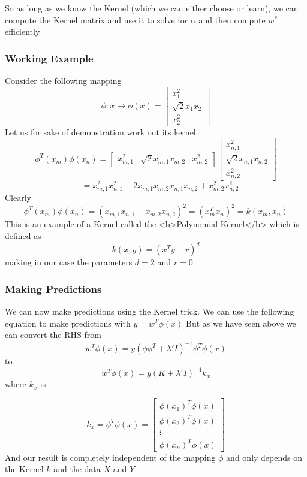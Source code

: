 \documentclass[hidelinks]{book}
\numberwithin{equation}{section}
\begin{document}
  So as long as we know the Kernel (which we can either choose or learn), we
  can compute the Kernel matrix and use it to solve for $\alpha$ and then
  compute $w^*$ efficiently

  \subsubsection{Working Example}
  Consider the following mapping $$ \phi: x \rightarrow \phi(x) = \begin{bmatrix}
  x_1^2 \\ \sqrt{2} x_1 x_2 \\ x_2^2 \end{bmatrix} $$
  Let us for sake of demonstration work out its kernel
  $$ \phi^T(x_m) \phi(x_n) = \begin{bmatrix} x_{m,1}^2 & \sqrt{2} x_{m,1}
  x_{m,2} & x_{m,2}^2 \end{bmatrix} \begin{bmatrix} x_{n,1}^2
  \\ \sqrt{2} x_{n,1} x_{n,2} \\ x_{n,2}^2 \end{bmatrix}
  $$
  $$ \quad = x_{m,1}^2 x_{n,1}^2 + 2 x_{m,1} x_{m,2} x_{n,1} x_{n,2}
  + x_{m,2}^2 x_{n,2}^2 $$
  Clearly $$ \phi^T(x_m) \phi(x_n) = (x_{m,1}
  x_{n,1} + x_{m,2} x_{n,2})^2 = (x_m^T x_n)^2 = k(x_m, x_n) $$
  This is an example of a Kernel called the <b>Polynomial Kernel</b> which is
  defined as $$ k(x, y) = (x^T y + r)^d $$ making in our case the parameters
  $d = 2$ and $r = 0$

  \subsubsection{Making Predictions}
  We can now make predictions using the Kernel trick. We can use the following
  equation to make predictions with $ y = w^T \phi(x) $ But as we have seen
  above we can convert the RHS from
  $$ w^T \phi(x) = y(\phi \phi^T + \lambda' I)^{-1} \phi^T \phi(x) $$
  to  $$ w^T \phi(x) = y(K + \lambda' I)^{-1} k_x $$ where $k_x$ is

  $$ k_x = \phi^T \phi(x) = \begin{bmatrix} \phi(x_1)^T \phi(x) \\ \phi(x_2)^T
  \phi(x) \\ \vdots \\ \phi(x_n)^T \phi(x) \end{bmatrix} $$ And our result
  is completely independent of the mapping $\phi$ and only depends on the Kernel
  $k$ and the data $X$ and $Y$
\end{document}
